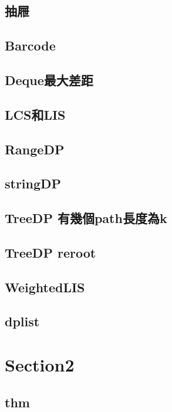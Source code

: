     \subsection{抽屜}
        
    \subsection{Barcode}
        
    \subsection{Deque最大差距}
        
    \subsection{LCS和LIS}
        
    \subsection{RangeDP}
        
    \subsection{stringDP}
        
    \subsection{TreeDP 有幾個path長度為k}
        
    \subsection{TreeDP reroot}
        
    \subsection{WeightedLIS}
        
    \subsection{dplist}
        
    

\section{Section2}
    \subsection{thm}
        